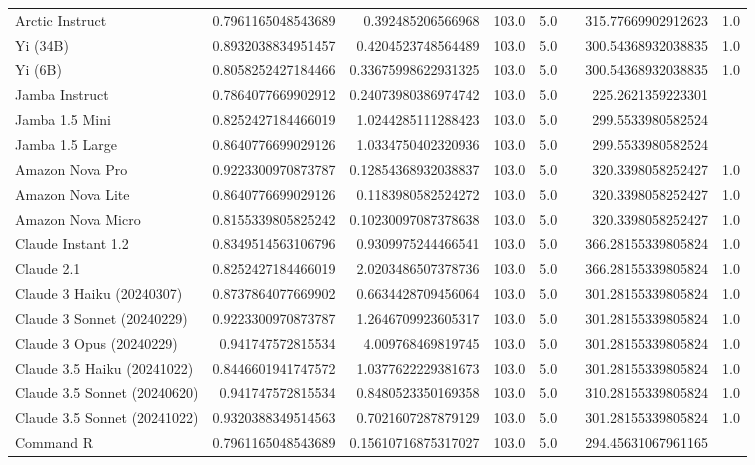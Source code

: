 \begin{table}[htp]
{\begin{tabular}{lrrrrrrr}
Arctic Instruct & 0.7961165048543689 & 0.392485206566968 & 103.0 & 5.0 &  & 315.77669902912623 & 1.0 \\
Yi (34B) & 0.8932038834951457 & 0.4204523748564489 & 103.0 & 5.0 &  & 300.54368932038835 & 1.0 \\
Yi (6B) & 0.8058252427184466 & 0.33675998622931325 & 103.0 & 5.0 &  & 300.54368932038835 & 1.0 \\
Jamba Instruct & 0.7864077669902912 & 0.24073980386974742 & 103.0 & 5.0 &  & 225.2621359223301 &  \\
Jamba 1.5 Mini & 0.8252427184466019 & 1.0244285111288423 & 103.0 & 5.0 &  & 299.5533980582524 &  \\
Jamba 1.5 Large & 0.8640776699029126 & 1.0334750402320936 & 103.0 & 5.0 &  & 299.5533980582524 &  \\
Amazon Nova Pro & 0.9223300970873787 & 0.12854368932038837 & 103.0 & 5.0 &  & 320.3398058252427 & 1.0 \\
Amazon Nova Lite & 0.8640776699029126 & 0.1183980582524272 & 103.0 & 5.0 &  & 320.3398058252427 & 1.0 \\
Amazon Nova Micro & 0.8155339805825242 & 0.10230097087378638 & 103.0 & 5.0 &  & 320.3398058252427 & 1.0 \\
Claude Instant 1.2 & 0.8349514563106796 & 0.9309975244466541 & 103.0 & 5.0 &  & 366.28155339805824 & 1.0 \\
Claude 2.1 & 0.8252427184466019 & 2.0203486507378736 & 103.0 & 5.0 &  & 366.28155339805824 & 1.0 \\
Claude 3 Haiku (20240307) & 0.8737864077669902 & 0.6634428709456064 & 103.0 & 5.0 &  & 301.28155339805824 & 1.0 \\
Claude 3 Sonnet (20240229) & 0.9223300970873787 & 1.2646709923605317 & 103.0 & 5.0 &  & 301.28155339805824 & 1.0 \\
Claude 3 Opus (20240229) & 0.941747572815534 & 4.009768469819745 & 103.0 & 5.0 &  & 301.28155339805824 & 1.0 \\
Claude 3.5 Haiku (20241022) & 0.8446601941747572 & 1.0377622229381673 & 103.0 & 5.0 &  & 301.28155339805824 & 1.0 \\
Claude 3.5 Sonnet (20240620) & 0.941747572815534 & 0.8480523350169358 & 103.0 & 5.0 &  & 310.28155339805824 & 1.0 \\
Claude 3.5 Sonnet (20241022) & 0.9320388349514563 & 0.7021607287879129 & 103.0 & 5.0 &  & 301.28155339805824 & 1.0 \\
Command R & 0.7961165048543689 & 0.15610716875317027 & 103.0 & 5.0 &  & 294.45631067961165 &  \\

\end{tabular}}
\end{table}
